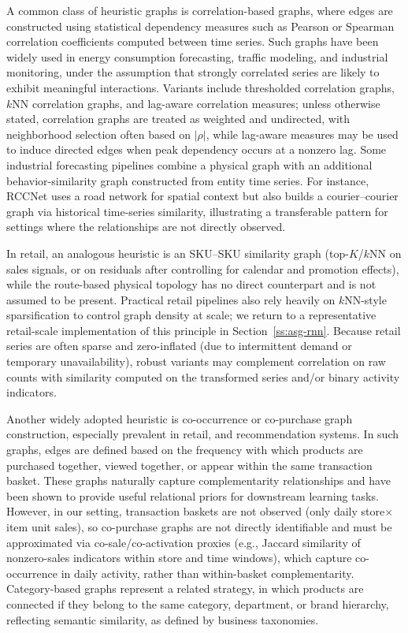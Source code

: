A common class of heuristic graphs is correlation-based graphs, where edges are constructed using
statistical dependency measures such as Pearson or Spearman correlation coefficients computed between
time series. Such graphs have been widely used in energy consumption forecasting, traffic modeling,
and industrial monitoring, under the assumption that strongly correlated series are likely to exhibit
meaningful interactions. Variants include thresholded correlation graphs, $k$NN correlation graphs,
and lag-aware correlation measures; unless otherwise stated, correlation graphs are treated as weighted
and undirected, with neighborhood selection often based on $|\rho|$, while lag-aware measures may be used
to induce directed edges when peak dependency occurs at a nonzero lag. Some industrial forecasting pipelines
combine a physical graph with an additional behavior-similarity graph constructed from entity time series.
For instance, RCCNet \cite{10.1145/3690649} uses a road network for spatial context but also builds a
courier--courier graph via historical time-series similarity, illustrating a transferable pattern for settings where the relationships are not directly observed.

In retail, an analogous heuristic is an SKU--SKU similarity graph (top-$K$/$k$NN on sales signals, or on
residuals after controlling for calendar and promotion effects), while the route-based physical topology
has no direct counterpart and is not assumed to be present. Practical retail pipelines also rely heavily on $k$NN-style sparsification to control graph density at scale; we return to a representative retail-scale implementation of this principle in Section~\ref{ss:asg-rnn}. Because retail series are often sparse and zero-inflated (due to intermittent demand or temporary unavailability), robust variants may complement correlation on raw counts with similarity computed on the transformed series and/or binary activity indicators.

Another widely adopted heuristic is co-occurrence or co-purchase graph construction, especially prevalent in
retail, and recommendation systems. In such graphs, edges are defined based on the frequency with which products are purchased together, viewed together, or appear within the same transaction basket. These graphs naturally capture complementarity relationships and have been shown to provide useful relational priors for downstream learning tasks. However, in our setting, transaction baskets are not observed (only daily store$\times$item unit sales), so co-purchase graphs are not directly identifiable and must be approximated via co-sale/co-activation proxies (e.g., Jaccard similarity of nonzero-sales indicators within store and time windows), which capture co-occurrence in daily
activity, rather than within-basket complementarity. Category-based graphs represent a related strategy, in which products are connected if they belong to the same category, department, or brand hierarchy, reflecting semantic similarity, as defined by business taxonomies.

